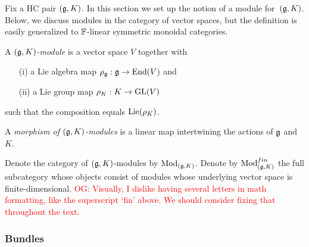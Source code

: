 \documentclass[10pt]{amsart}
\def\brian{\textcolor{blue}{BW: }\textcolor{blue}}
\def\owen{\textcolor{red}{OG: }\textcolor{red}}
\begin{document}
%

Fix a HC pair $(\mathfrak g,K)$. In this section we set up the notion of a module for~$(\mathfrak g,K)$. 
Below, we discuss modules in the category of vector spaces, but the definition is easily generalized to $\mathbb{F}$-linear symmetric monoidal categories.

\begin{dfn} \label{hcmod}
A {\em $(\mathfrak g,K)$-module} is a vector space $V$ together with 
\begin{itemize}
\item[(i)] a Lie algebra map $\rho_\mathfrak g : \mathfrak g \to {\rm End}(V)$ and
\item[(ii)] a Lie group map $\rho_K : K \to {\rm GL}(V)$ 
\end{itemize}
such that the composition
\ben
{}
\een
equals ${\rm Lie}(\rho_K)$. 
\end{dfn}


A {\em morphism of $(\mathfrak g,K)$-modules} is a linear map intertwining the actions of $\mathfrak g$ and $K$.

Denote the category of $(\mathfrak g,K)$-modules by ${\rm Mod}_{(\mathfrak g,K)}$.
Denote by ${\rm Mod}_{(\mathfrak g,K)}^{fin}$ the full subcategory whose objects consist of modules whose underlying vector space is finite-dimensional.
\owen{Visually, I dislike having several letters in math formatting, like the superscript `fin' above. We should consider fixing that throughout the text.}

\subsubsection{Bundles}
\end{document}
